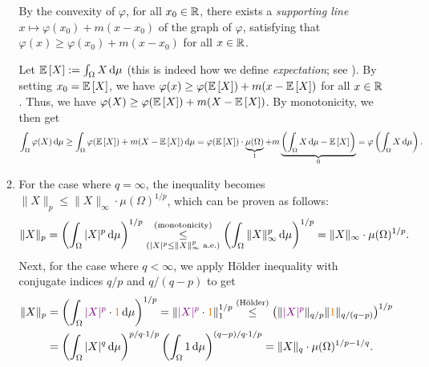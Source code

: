 \begin{enumerate}
\begin{pf}
\begin{enumerate}
By the convexity of \(\varphi\), for all \(x_0\in\mathbb{R}\), there
exists a \emph{supporting line} \(x\mapsto \varphi(x_0)+m(x-x_0)\) of the graph
of \(\varphi\), satisfying that \(\varphi(x)\ge\varphi(x_0)+m(x-x_0)\) for all
\(x\in\mathbb{R}\).

\begin{center}
\end{center}

Let \(\expv{X}:=\int_{\Omega}^{}X\odif{\mu}\) (this is indeed how we define
\emph{expectation}; see ).  By setting
\(x_0=\mathbb{E}\left[X\right]\), we have \(\varphi(x)\ge \varphi(\mathbb{E}\left[X\right])+m(x-\mathbb{E}\left[X\right])\) for
all \(x\in\mathbb{R}\). Thus, we have \(\varphi(X)\ge
\varphi(\mathbb{E}\left[X\right])+m(X-\mathbb{E}\left[X\right])\). By monotonicity, we then get
\[
\int_{\Omega}^{}\varphi(X)\odif{\mu}\ge \int_{\Omega}^{}\varphi(\expv{X})
+m(X-\expv{X})\odif{\mu}
=\varphi(\expv{X})\cdot \underbrace{\mu(\Omega)}_{1}
+m\underbrace{\left(\int_{\Omega}^{}X\odif{\mu}-\expv{X}\right)}_{0}
=\varphi\left(\int_{\Omega}^{}X\odif{\mu}\right).
\]
\item For the case where \(q=\infty\), the inequality becomes
\(\|X\|_{p}\le\|X\|_{\infty}\cdot \mu(\Omega)^{1/p}\), which can be proven as
follows:
\[
\|X\|_{p}=\left(\int_{\Omega}^{}|X|^{p}\odif{\mu}\right)^{1/p}
\underset{(|X|^p\le \|X\|_{\infty}^{p}\text{ a.e.})}{\overset{\text{(monotonicity)}}{\le}}
\left(\int_{\Omega}^{}\|X\|_{\infty}^{p}\odif{\mu}\right)^{1/p}
=\|X\|_{\infty}\cdot \mu(\Omega)^{1/p}.
\]
Next, for the case where \(q<\infty\), we apply H\"older inequality with
conjugate indices \(q/p\) and \(q/(q-p)\) to get
\begin{align*}
\|X\|_{p}&=\left(\int_{\Omega}^{}\vc{|X|^{p}}\cdot \orc{1}\odif{\mu}\right)^{1/p}
=\|\vc{|X|^{p}}\cdot \orc{1}\|_{1}^{1/p}
\overset{\text{(H\"older)}}{\le}
\left(\|\vc{|X|^{p}}\|_{q/p}\|\orc{1}\|_{q/(q-p)}\right)^{1/p} \\
&=\left(\int_{\Omega}^{}|X|^{q}\odif{\mu}\right)^{p/q\cdot 1/p}
\left(\int_{\Omega}^{}1\odif{\mu}\right)^{(q-p)/q\cdot 1/p}
=\|X\|_{q}\cdot \mu(\Omega)^{1/p-1/q}.
\end{align*}
\end{enumerate}
\end{pf}
\end{enumerate}
